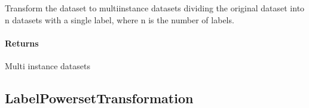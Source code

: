 \documentclass[letterpaper,10pt,english]{sphinxmanual}
\begin{document}
\begin{fulllineitems}
\begin{fulllineitems}
\begin{description}
\end{description}

\end{fulllineitems}


\begin{fulllineitems}
\label{\detokenize{transformation/mimlTOmi/_autosummary/miml.transformation.mimlTOmi.binary_relevance_transformation.BinaryRelevanceTransformation:miml.transformation.mimlTOmi.binary_relevance_transformation.BinaryRelevanceTransformation.transform_dataset}}
\pysigstartsignatures
{}
\pysigstopsignatures
\sphinxAtStartPar
Transform the dataset to multi\sphinxhyphen{}instance datasets dividing the original dataset into n datasets with a single
label, where n is the number of labels.


\paragraph{Returns}
\label{\detokenize{transformation/mimlTOmi/_autosummary/miml.transformation.mimlTOmi.binary_relevance_transformation.BinaryRelevanceTransformation:id1}}\begin{description}
\sphinxAtStartPar
Multi instance datasets

\end{description}

\end{fulllineitems}


\end{fulllineitems}


\sphinxstepscope


\subsection{LabelPowersetTransformation}
\label{\detokenize{transformation/mimlTOmi/label_powerset_transformation:labelpowersettransformation}}\label{\detokenize{transformation/mimlTOmi/label_powerset_transformation::doc}}
\end{document}
